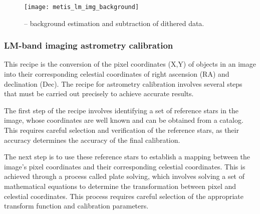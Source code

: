 \begin{figure}[hb]
  \centering
  \texttt{[image: metis\_lm\_img\_background]}
  \caption[Recipe: ]{ --
    background estimation and subtraction of dithered  data.}
  \label{fig:metis_lm_img_background}
\end{figure}


\clearpage

\subsubsection{LM-band imaging astrometry calibration}
\label{sssec:lm_img_astrometry_calib}
This recipe is the conversion of the pixel coordinates (X,Y) of objects in an image 
into their corresponding celestial coordinates of right ascension (RA) and 
declination (Dec). The recipe for astrometry calibration involves several 
steps that must be carried out precisely to achieve accurate results.

The first step of the recipe involves identifying a set of reference stars 
in the image, whose coordinates are well known and can be obtained from a 
catalog. This requires careful selection and verification of the reference stars, 
as their accuracy determines the accuracy of the final calibration.

The next step is to use these reference stars to establish a mapping between 
the image's pixel coordinates and their corresponding celestial coordinates. This 
is achieved through a process called plate solving, which involves solving a set 
of mathematical equations to determine the transformation between pixel and celestial 
coordinates. This process requires careful selection of the appropriate transform function 
and calibration parameters.

